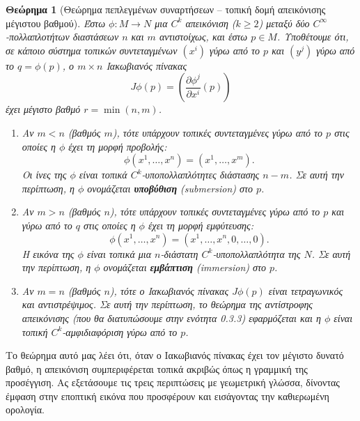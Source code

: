 \documentclass[11pt,a4paper,twoside,openright]{book}
\newtheorem{theorem}[lemma]{Θεώρημα}
\begin{document}
\begin{theorem}[Θεώρημα πεπλεγμένων συναρτήσεων -- τοπική δομή απεικόνισης μέγιστου βαθμού]
Έστω $\phi: M \to N$ μια $C^k$ απεικόνιση ($k \geq 2$) μεταξύ δύο $C^\infty$-πολλαπλοτήτων διαστάσεων $n$ και $m$ αντιστοίχως, και έστω $p \in M$. Υποθέτουμε ότι, σε κάποιο σύστημα τοπικών συντεταγμένων $(x^i)$ γύρω από το $p$ και $(y^j)$ γύρω από το $q = \phi(p)$, ο $m \times n$ Ιακωβιανός πίνακας
\begin{equation}
J\phi(p) = \left( \frac{\partial \phi^j}{\partial x^i}(p) \right)
\end{equation}
έχει μέγιστο βαθμό $r = \min(n, m)$.

\begin{enumerate}
\item Αν $m < n$ (βαθμός $m$), τότε υπάρχουν τοπικές συντεταγμένες γύρω από το $p$ στις οποίες η $\phi$ έχει τη μορφή προβολής:
\begin{equation}
\phi(x^1, \dots, x^n) = (x^1, \dots, x^m).
\end{equation}
Οι ίνες της $\phi$ είναι τοπικά $C^k$-υποπολλαπλότητες διάστασης $n - m$. Σε αυτή την περίπτωση, η $\phi$ ονομάζεται \textbf{υποβύθιση} (submersion) στο $p$.

\item Αν $m > n$ (βαθμός $n$), τότε υπάρχουν τοπικές συντεταγμένες γύρω από το $p$ και γύρω από το $q$ στις οποίες η $\phi$ έχει τη μορφή εμφύτευσης:
\begin{equation}
\phi(x^1, \dots, x^n) = (x^1, \dots, x^n, 0, \dots, 0).
\end{equation}
Η εικόνα της $\phi$ είναι τοπικά μια $n$-διάστατη $C^k$-υποπολλαπλότητα της $N$. Σε αυτή την περίπτωση, η $\phi$ ονομάζεται \textbf{εμβάπτιση} (immersion) στο $p$.

\item Αν $m = n$ (βαθμός $n$), τότε ο Ιακωβιανός πίνακας $J\phi(p)$ είναι τετραγωνικός και αντιστρέψιμος. Σε αυτή την περίπτωση, το θεώρημα της αντίστροφης απεικόνισης (που θα διατυπώσουμε στην ενότητα 0.3.3) εφαρμόζεται και η $\phi$ είναι τοπική $C^k$-αμφιδιαφόριση γύρω από το $p$.
\end{enumerate}
\end{theorem}

Το θεώρημα αυτό μας λέει ότι, όταν ο Ιακωβιανός πίνακας έχει τον μέγιστο δυνατό βαθμό, η απεικόνιση συμπεριφέρεται τοπικά ακριβώς όπως η γραμμική της προσέγγιση. Ας εξετάσουμε τις τρεις περιπτώσεις με γεωμετρική γλώσσα, δίνοντας έμφαση στην εποπτική εικόνα που προσφέρουν και εισάγοντας την καθιερωμένη ορολογία.
\end{document}
